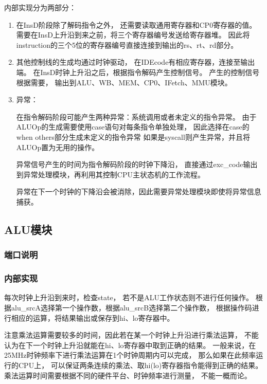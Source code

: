             内部实现分为两部分：%
            \begin{enumerate}
            \item
            在InsD阶段除了解码指令之外，%
            还需要读取通用寄存器和CP0寄存器的值。%
            需要在InsD上升沿到来之前，将三个寄存器编号发送给寄存器堆。%
            因此将instruction的三个5位的寄存器编号直接连接到输出的rs、rt、rd部分。%
            \item
            其他控制线的生成均通过时钟驱动，%
            在IDEcode有相应寄存器，连接至输出端。%
            在InsD时钟上升沿之后，根据指令解码产生控制信号。%
            产生的控制信号根据需要，%
            输出到ALU、WB、MEM、CP0、IFetch、MMU模块。
            \item
            异常：

            在指令解码阶段可能产生两种异常：系统调用或者未定义的指令异常。%
            由于ALUOp的生成需要使用case语句对每条指令单独处理，%
            因此选择在case的when others部分生成未定义的指令异常%
            如果是syscall则产生异常，并且将ALUOp置为无用的操作。%

            异常信号产生的时间为指令解码阶段的时钟下降沿，%
            直接通过exc\_code输出到异常处理模块，再利用其控制CPU主状态机的工作流程。

            异常在下一个时钟的下降沿会被消除，因此需要异常处理模块即使将异常信息捕获。

            \end{enumerate}

    \subsection{ALU模块}
        \subsubsection{端口说明}
            
        \subsubsection{内部实现}
            每次时钟上升沿到来时，检查state，%
            若不是ALU工作状态则不进行任何操作。%
            根据alu\_srcA选择第一个操作数，根据alu\_srcB选择第二个操作数，%
            根据操作码进行相应的运算，将结果输出或保存到hi、lo寄存器中。

            注意乘法运算需要较多的时间，因此若在某一个时钟上升沿进行乘法运算，%
            不能认为在下一个时钟上升沿就能在hi、lo寄存器中取到正确的结果。%
            一般来说，在25MHz时钟频率下进行乘法运算在1个时钟周期内可以完成，%
            那么如果在此频率运行的CPU上，%
            可以保证两条连续的乘法、取hi(lo)寄存器指令能得到正确的结果。%
            乘法运算时间需要根据不同的硬件平台、时钟频率进行测量，%
            不能一概而论。
